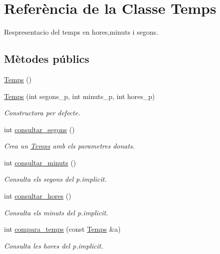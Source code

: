 \hypertarget{class_temps}{\section{Referència de la Classe Temps}
\label{class_temps}
}


Respresentacio del temps en hores,minuts i segons.  


\subsection*{Mètodes públics}
\begin{DoxyCompactItemize}
\item 
\hyperlink{class_temps_a0146b538b96214826a580019b4684daa}{Temps} ()
\item 
\hyperlink{class_temps_aafdeb338cffd2ad73a4a40c15185ba10}{Temps} (int segons\-\_\-p, int minuts\-\_\-p, int hores\-\_\-p)
\begin{DoxyCompactList}\small\item\em Constructora per defecte. \end{DoxyCompactList}\item 
int \hyperlink{class_temps_a766b7d3c06cd8320b13854d31bac4251}{consultar\-\_\-segons} ()
\begin{DoxyCompactList}\small\item\em Crea un \hyperlink{class_temps}{Temps} amb els parametres donats. \end{DoxyCompactList}\item 
int \hyperlink{class_temps_a8af21ff997b0893f9a2f2f8eccf8dc8c}{consultar\-\_\-minuts} ()
\begin{DoxyCompactList}\small\item\em Consulta els segons del p.\-implicit. \end{DoxyCompactList}\item 
int \hyperlink{class_temps_ae9f07c4548a30807e3056f217e837eb3}{consultar\-\_\-hores} ()
\begin{DoxyCompactList}\small\item\em Consulta els minuts del p.\-implicit. \end{DoxyCompactList}\item 
int \hyperlink{class_temps_ad7dfb62dadfa4f00adf58936d9cba7ed}{compara\-\_\-temps} (const \hyperlink{class_temps}{Temps} \&a)
\begin{DoxyCompactList}\small\item\em Consulta les hores del p.\-implicit. \end{DoxyCompactList}\item 

\end{DoxyCompactItemize}
